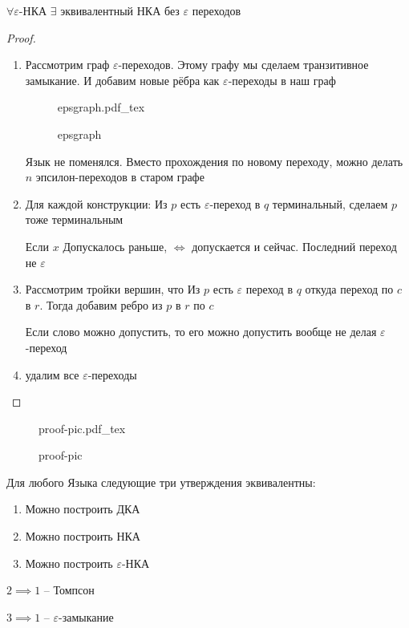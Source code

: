 \documentclass{book}
\theoremstyle{definition}
\newcommand{\incfig}[1]{%
    \def\svgwidth{\columnwidth}
    {#1.pdf_tex}
}
\begin{document}
\begin{statement}
    $\forall \varepsilon$-НКА $\exists $ эквивалентный НКА без $\varepsilon$ переходов
\end{statement}
\begin{proof}
    \begin{enumerate}
        \item Рассмотрим граф $\varepsilon$-переходов. Этому графу мы сделаем транзитивное замыкание. И добавим новые рёбра как $\varepsilon$-переходы в наш граф

\begin{figure}[!ht]
    \centering
    \incfig{epsgraph}
    \caption{epsgraph}
    \label{fig:epsgraph}
\end{figure}

Язык не поменялся. Вместо прохождения по новому переходу, можно делать $n$ эпсилон-переходов в старом графе
        \item Для каждой конструкции: Из $p$ есть  $\varepsilon$-переход в $q$ терминальный, сделаем  $p$ тоже терминальным

             \begin{statement}
                Если $x$ Допускалось раньше, $\iff $ допускается и сейчас. Последний переход не $\varepsilon$
            \end{statement}
        \item Рассмотрим тройки вершин, что Из  $p$ есть  $\varepsilon$ переход в $q$ откуда переход по  $c$ в  $r$. Тогда добавим ребро из  $p$ в  $r$ по  $c$

            \begin{statement}
                Если слово можно допустить, то его можно допустить вообще не делая $\varepsilon$-переход
            \end{statement}
        \item удалим все $\varepsilon$-переходы 
    \end{enumerate}
\end{proof}
\begin{figure}[!ht]
    \centering
    \incfig{proof-pic}
    \caption{proof-pic}
    \label{fig:proof-pic}
\end{figure}

\begin{statement}
    Для любого Языка следующие три утверждения эквивалентны:
    \begin{enumerate}
        \item Можно построить ДКА
        \item Можно построить НКА 
        \item Можно построить $\varepsilon$-НКА
    \end{enumerate}

    $2 \implies 1$ -- Томпсон

    $3 \implies 1$ -- $\varepsilon$-замыкание
\end{statement}
\end{document}
